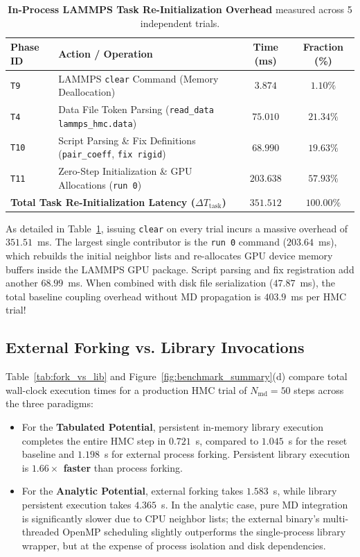 \documentclass[11pt,a4paper]{article}
\begin{document}
\begin{table}[b]
\centering
\small
\caption{\textbf{In-Process LAMMPS Task Re-Initialization Overhead} measured across 5 independent trials.}
\label{tab:task_breakdown}
\begin{tabularx}{\textwidth}{lXcc}
\toprule
\textbf{Phase ID} & \textbf{Action / Operation} & \textbf{Time (ms)} & \textbf{Fraction (\%)} \\
\midrule
\texttt{T9}  & LAMMPS \texttt{clear} Command (Memory Deallocation) & $3.874$   & $1.10\%$ \\
\texttt{T4}  & Data File Token Parsing (\texttt{read\_data lammps\_hmc.data}) & $75.010$  & $21.34\%$ \\
\texttt{T10} & Script Parsing \& Fix Definitions (\texttt{pair\_coeff}, \texttt{fix rigid}) & $68.990$  & $19.63\%$ \\
\texttt{T11} & Zero-Step Initialization \& GPU Allocations (\texttt{run 0}) & $203.638$ & $57.93\%$ \\
\midrule
\multicolumn{2}{l}{\textbf{Total Task Re-Initialization Latency ($\Delta T_{\mathrm{task}}$)}} & $\mathbf{351.512}$ & $100.00\%$ \\
\bottomrule
\end{tabularx}
\end{table}

As detailed in Table~\ref{tab:task_breakdown}, issuing \texttt{clear} on every trial incurs a massive overhead of $\mathbf{351.51}$~ms. The largest single contributor is the \texttt{run 0} command ($203.64$~ms), which rebuilds the initial neighbor lists and re-allocates GPU device memory buffers inside the LAMMPS GPU package. Script parsing and fix registration add another $68.99$~ms. When combined with disk file serialization ($47.87$~ms), the total baseline coupling overhead without MD propagation is $\mathbf{403.9}$~ms per HMC trial!

\subsection{External Forking vs. Library Invocations}

Table~\ref{tab:fork_vs_lib} and Figure~\ref{fig:benchmark_summary}(d) compare total wall-clock execution times for a production HMC trial of $N_{\mathrm{md}} = 50$ steps across the three paradigms:
\begin{itemize}
    \item For the \textbf{Tabulated Potential}, persistent in-memory library execution completes the entire HMC step in $\mathbf{0.721}$~s, compared to $1.045$~s for the reset baseline and $1.198$~s for external process forking. Persistent library execution is \textbf{$1.66\times$ faster} than process forking.
    \item For the \textbf{Analytic Potential}, external forking takes $1.583$~s, while library persistent execution takes $4.365$~s. In the analytic case, pure MD integration is significantly slower due to CPU neighbor lists; the external binary's multi-threaded OpenMP scheduling slightly outperforms the single-process library wrapper, but at the expense of process isolation and disk dependencies.
\end{itemize}
\end{document}
